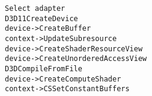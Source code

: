 \lstset{language=C++}
\begin{lstlisting}
Select adapter
D3D11CreateDevice
device->CreateBuffer
context->UpdateSubresource
device->CreateShaderResourceView
device->CreateUnorderedAccessView
D3DCompileFromFile
device->CreateComputeShader
context->CSSetConstantBuffers
\end{lstlisting}